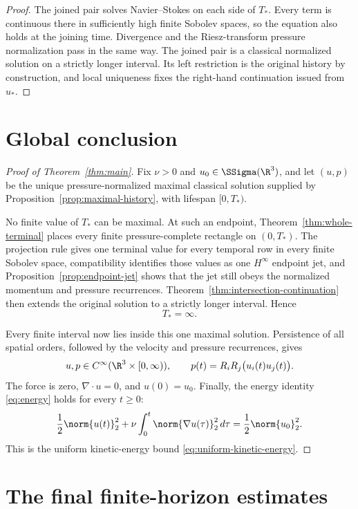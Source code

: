 \begin{proof}
The joined pair solves Navier--Stokes on each side of \(T_*\).  Every term is
continuous there in sufficiently high finite Sobolev spaces, so the equation
also holds at the joining time.  Divergence and the Riesz-transform pressure
normalization pass in the same way.  The joined pair is a classical
normalized solution on a strictly longer interval.  Its left restriction is
the original history by construction, and local uniqueness fixes the
right-hand continuation issued from \(u_*\).
\end{proof}

\section{Global conclusion}

\begin{proof}[Proof of Theorem~\ref{thm:main}]
Fix \(\nu>0\) and \(u_0\in\SSigma(\R^3)\), and let \((u,p)\) be the unique
pressure-normalized maximal classical solution supplied by
Proposition~\ref{prop:maximal-history}, with lifespan \([0,T_*)\).

No finite value of \(T_*\) can be maximal.  At such an endpoint,
Theorem~\ref{thm:whole-terminal} places every finite pressure-complete
rectangle on \((0,T_*)\).  The projection rule gives one terminal value for
every temporal row in every finite Sobolev space, compatibility identifies
those values as one \(H^\infty\) endpoint jet, and
Proposition~\ref{prop:endpoint-jet} shows that the jet still obeys the
normalized momentum and pressure recurrences.
Theorem~\ref{thm:intersection-continuation} then extends the original solution
to a strictly longer interval.  Hence
\[
 T_*=\infty.
\]

Every finite interval now lies inside this one maximal solution.  Persistence
of all spatial orders, followed by the velocity and pressure recurrences, gives
\[
 u,p\in C^\infty(\R^3\times[0,\infty)),
 \qquad
 p(t)=R_iR_j\bigl(u_i(t)u_j(t)\bigr).
\]
The force is zero, \(\nabla\cdot u=0\), and \(u(0)=u_0\).  Finally, the
energy identity \eqref{eq:energy} holds for every \(t\ge0\):
\[
 \frac12\norm{u(t)}_2^2
 +\nu\int_0^t\norm{\nabla u(\tau)}_2^2\,d\tau
 =\frac12\norm{u_0}_2^2.
\]
This is the uniform kinetic-energy bound
\eqref{eq:uniform-kinetic-energy}.
\end{proof}

\section{The final finite-horizon estimates}
\label{sec:final-estimates}

